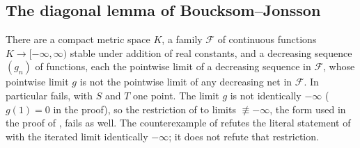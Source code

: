 \subsection{The diagonal lemma of Boucksom--Jonsson}\label{subsec:nn-bj-lemma}

\begin{proposition}\label{prop:nn-bj-lemma46-false}
\leanok
There are a compact metric space $K$, a family $\mathcal F$ of continuous functions $K\to[-\infty,\infty)$ stable under addition of
real constants, and a decreasing sequence $(g_n)$ of functions, each the pointwise limit of a decreasing sequence in $\mathcal F$,
whose pointwise limit $g$ is not the pointwise limit of any decreasing net in $\mathcal F$. In particular \cite[Lemma~4.6]{BJ22}
fails, with $S$ and $T$ one point. The limit $g$ is not identically $-\infty$ ($g(1)=0$ in the proof), so the restriction of
\cite[Lemma~4.6]{BJ22} to limits $\not\equiv-\infty$, the form used in the proof of \cite[Theorem~4.5]{BJ22}, fails as well. The
counterexample of \cite[Remark~2.2]{FHX} refutes the literal statement of \cite[Lemma~4.6]{BJ22} with the iterated limit
identically $-\infty$; it does not refute that restriction.
\end{proposition}

